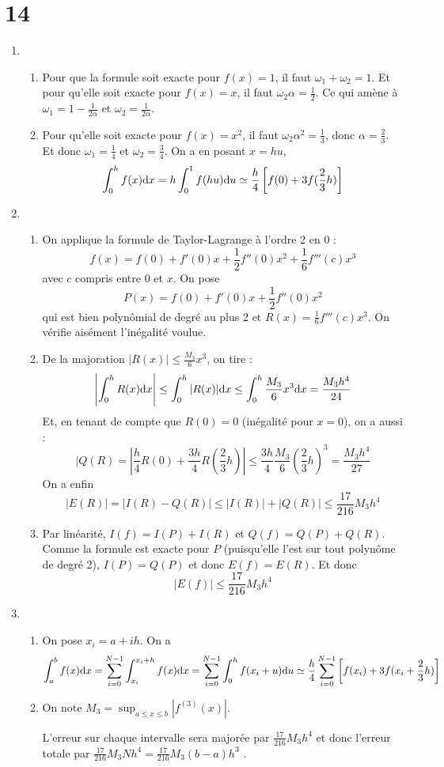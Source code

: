 \documentclass[a4paper]{article}
\def \de {{\rm d}}
\begin{document}
\section*{14}
\begin{enumerate}
\item \begin{enumerate}
\item Pour que la formule soit exacte pour $f(x) = 1$, il faut $\omega_1+\omega_2 = 1$. Et pour qu'elle soit exacte pour $f(x) = x$, il faut $\omega_2\alpha =\frac 12$. Ce qui amène à $\omega_1 = 1 -\frac{1}{2\alpha}$ et $\omega_2 = \frac{1}{2\alpha}$.
\item Pour qu'elle soit exacte pour $f(x) = x^2$, il faut $\omega_2\alpha^2 =\frac 13$, donc $\alpha=\frac 23$. Et donc $\omega_1 = \frac{1}{4}$ et $\omega_2 = \frac{3}{4}$.
On a en posant $x=hu$,
\[\int_0^hf(x)\de x = h\int_0^1f(hu)\de u \simeq \frac h4\left[f(0)+3f(\frac 23h)\right]\]
\end{enumerate}
\item\begin{enumerate}
\item On applique la formule de Taylor-Lagrange à l'ordre 2 en 0 :
\[f(x)=f(0)+f'(0)x+\frac 12 f''(0)x^2+\frac 16f'''(c)x^3\]
avec $c$ compris entre 0 et $x$. On pose
\[P(x)=f(0)+f'(0)x+\frac 12 f''(0)x^2\]
qui est bien polynômial de degré au plus 2 et $R(x)=\frac 16f'''(c)x^3$. On vérifie aisément l'inégalité voulue.
\item De la majoration $|R(x)|\leq \frac{M_3}{6} x^3$, on tire :
\[\left|\int_0^hR(x)\de x\right|\leq \int_0^h|R(x)|\de x\leq \int_0^h\frac{M_3}{6} x^3\de x=\frac{M_3 h^4}{24}\]
Et, en tenant de compte que $R(0) = 0$ (inégalité pour $x = 0$), on a aussi :
\[|Q(R) = \left|\frac h4R(0)+\frac{3h}{4}R(\frac 23h)\right|\leq \frac{3h}{4}\frac{M_3}{6}(\frac 23h)^3 = \frac{M_3 h^4}{27}\]
On a enfin
\[|E(R)|=|I(R)-Q(R)|\leq |I(R)|+|Q(R)|\leq \frac{17}{216}M_3 h^4\]
\item Par linéarité, $I(f) = I(P) + I(R)$ et $Q(f) = Q(P) + Q(R)$. Comme la
formule est exacte pour $P$ (puisqu'elle l'est sur tout polynôme de degré 2), $I(P) =Q(P)$ et donc $E(f) = E(R)$. Et donc
\[|E(f)|\leq \frac{17}{216}M_3 h^4\]
\end{enumerate}
\item\begin{enumerate}
\item On pose $x_i = a + ih$. On a
\[\int_a^bf(x)\de x = \sum_{i=0}^{N-1}\int_{x_i}^{x_i+h}f(x)\de x =\sum_{i=0}^{N-1}\int_{0}^{h}f(x_i+u)\de u \simeq \frac h4\sum_{i=0}^{N-1} \left[f(x_i)+3f(x_i+\frac 23h)\right]\]  
\item On note $M_3 = \displaystyle \sup_{a\leq x\leq b}|f^{(3)}(x)|$.

L'erreur sur chaque intervalle sera majorée par $\frac{17}{216}M_3 h^4$  et donc l'erreur totale par $\frac{17}{216}M_3 N h^4=\frac{17}{216}M_3 (b-a) h^3$ .

\end{enumerate}
\end{enumerate}
\end{document}
